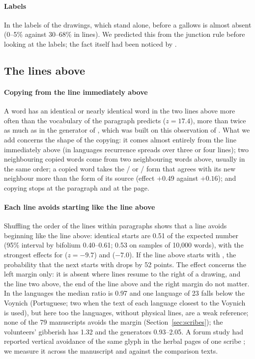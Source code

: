 \paragraph{Labels} In the labels of the drawings, which stand alone,  before a gallows is almost absent (0--5\%
against 30--68\% in lines). We predicted this from the junction rule before looking at the labels; the fact itself had
been noticed by \citet{zandbergen_labels}.

\subsection{The lines above}
\label{sec:vertical}

\paragraph{Copying from the line immediately above} A word has an identical or nearly identical word in the two lines
above more often than the vocabulary of the paragraph predicts ($z = 17.4$), more than twice as much as in the generator
of \citet{timmschinner2020}, which was built on this observation of \citet{timm2014}. What we add concerns the shape of
the copying: it comes almost entirely from the line immediately above (in languages recurrence spreads over three or
four lines); two neighbouring copied words come from two neighbouring words above, usually in the same order; a copied
word takes the / or / form that agrees with its new neighbour more than the form of its
source (effect $+0.49$ against $+0.16$); and copying stops at the paragraph and at the page.

\paragraph{Each line avoids starting like the line above} Shuffling the order of the lines within paragraphs shows that
a line avoids beginning like the line above: identical starts are 0.51 of the expected number (95\% interval by bifolium
0.40--0.61; 0.53 on samples of 10{,}000 words), with the strongest effects for  ($z = -9.7$) and 
($-7.0$). If the line above starts with , the probability that the next starts with  drops by 52
points. The effect concerns the left margin only: it is absent where lines resume to the right of a drawing, and the
line two above, the end of the line above and the right margin do not matter. In the languages the median ratio is 0.97
and one language of 23 falls below the Voynich (Portuguese; two when the text of each language closest to the
Voynich is used), but here too the languages, without physical lines, are a weak reference; none of the 79
manuscripts avoids the margin (Section~\ref{sec:scribes}); the volunteers' gibberish
has 1.32 and the generators 0.93--2.05. A forum study had reported vertical avoidance of the same glyph in the herbal
pages of one scribe \citep{tavie2024}; we measure it across the manuscript and against the comparison texts.

